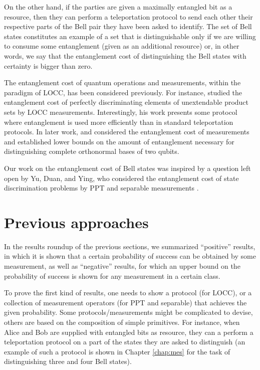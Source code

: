 On the other hand, if the parties are given a maximally entangled bit as a resource,
then they can perform a teleportation protocol to send each other their respective parts of 
the Bell pair they have been asked to identify.
The set of Bell states constitutes an example of a set that is distinguishable only if we 
are willing to consume some entanglement (given as an additional resource) or, in other words, 
we say that the entanglement cost of distinguishing the Bell states with certainty is bigger than zero.

The entanglement cost of quantum operations and measurements, within the
paradigm of LOCC, has been considered previously.
For instance, \cite{Cohen08} studied the entanglement cost of perfectly
discriminating elements of unextendable product sets by LOCC measurements.
Interestingly, his work presents some protocol where entanglement is used more 
efficiently than in standard teleportation protocols.
In later work, \cite{Bandyopadhyay09} and \cite{Bandyopadhyay10} considered the
entanglement cost of measurements and established lower bounds on the amount of
entanglement necessary for distinguishing complete orthonormal bases of two
qubits.

Our work on the entanglement cost of Bell states was inspired by a question left open by Yu, Duan, and Ying, who considered the entanglement cost of state discrimination problems by PPT and separable measurements \cite{Yu14}.


\section{Previous approaches}

In the results roundup of the previous sections, we summarized ``positive''
results, in which it is shown that a certain probability of success can be obtained by 
some measurement, as well as ``negative'' results, for which an upper bound
on the probability of success is shown for any measurement in a certain class.

To prove the first kind of results, one needs to show a protocol (for LOCC), 
or a collection of measurement operators (for PPT and separable) that achieves 
the given probability.
Some protocols/measurements might be complicated to devise, others are based on 
the composition of simple primitives. For instance, when Alice and Bob are 
supplied with entangled bits as resource, they can a perform a teleportation
protocol on a part of the states they are asked to distinguish 
(an example of such a protocol is shown in Chapter \ref{chap:mes}
for the task of distinguishing three and four Bell states).

